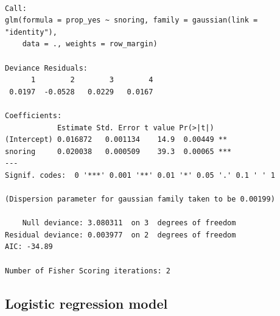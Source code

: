 \documentclass[]{book}
\newenvironment{Shaded}{\begin{snugshade}}{\end{snugshade}}
\newcommand{\DataTypeTok}[1]{\textcolor[rgb]{0.13,0.29,0.53}{#1}}
\newcommand{\DecValTok}[1]{\textcolor[rgb]{0.00,0.00,0.81}{#1}}
\newcommand{\KeywordTok}[1]{\textcolor[rgb]{0.13,0.29,0.53}{\textbf{#1}}}
\newcommand{\NormalTok}[1]{#1}
\newcommand{\OperatorTok}[1]{\textcolor[rgb]{0.81,0.36,0.00}{\textbf{#1}}}
\newcommand{\StringTok}[1]{\textcolor[rgb]{0.31,0.60,0.02}{#1}}
\begin{document}
\begin{verbatim}

Call:
glm(formula = prop_yes ~ snoring, family = gaussian(link = "identity"), 
    data = ., weights = row_margin)

Deviance Residuals: 
      1        2        3        4  
 0.0197  -0.0528   0.0229   0.0167  

Coefficients:
            Estimate Std. Error t value Pr(>|t|)    
(Intercept) 0.016872   0.001134    14.9  0.00449 ** 
snoring     0.020038   0.000509    39.3  0.00065 ***
---
Signif. codes:  0 '***' 0.001 '**' 0.01 '*' 0.05 '.' 0.1 ' ' 1

(Dispersion parameter for gaussian family taken to be 0.00199)

    Null deviance: 3.080311  on 3  degrees of freedom
Residual deviance: 0.003977  on 2  degrees of freedom
AIC: -34.89

Number of Fisher Scoring iterations: 2
\end{verbatim}

\hypertarget{logistic-regression-model-1}{%
\subsection{Logistic regression model}\label{logistic-regression-model-1}}

\begin{Shaded}
\end{Shaded}
\end{document}
